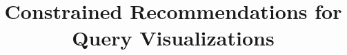 %
%
%
%
%

\RequirePackage{fix-cm}
%
\documentclass[smallextended]{svjour3}       %
%
\smartqed  %
%
\usepackage{graphicx}
\usepackage[ruled,vlined]{algorithm2e}
\usepackage{subcaption} 
\usepackage{amsmath}
\usepackage{hyperref}
\usepackage{color}
%
\newcommand{\eat}[1]{}
\newcommand{\red}[1]{{\color{red} #1}}
\newcommand{\blue}[1]{{\color{blue} #1}}
%
%
%
%
%


\title{Constrained Recommendations for Query Visualizations%
}


